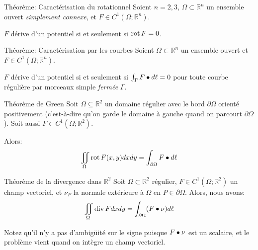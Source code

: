 \documentclass[a4paper]{article}
\begin{document}
\begin{parag}{Théorème: Caractérisation du rotationnel}
    Soient $n = 2, 3$, $\Omega \subset \mathbb{R}^n$ un ensemble ouvert \textit{simplement connexe}, et $F \in C^1\left(\Omega; \mathbb{R}^n\right)$.

    $F$ dérive d'un potentiel si et seulement si $\operatorname{rot} F = 0$.
\end{parag}

\begin{parag}{Théorème: Caractérisation par les courbes}
    Soient $\Omega \subset \mathbb{R}^n$ un ensemble ouvert et $F \in C^1\left(\Omega; \mathbb{R}^n\right)$.

    $F$ dérive d'un potentiel si et seulement si $\int_{\Gamma} F \bullet d \ell = 0$ pour toute courbe régulière par morceaux simple \textit{fermée} $\Gamma$.
\end{parag}


\begin{parag}{Théorème de Green}
    Soit $\Omega \subseteq \mathbb{R}^2$ un domaine régulier avec le bord $\partial \Omega$ orienté positivement (c'est-à-dire qu'on garde le domaine à gauche quand on parcourt $\partial \Omega$). Soit aussi $F \in C^1\left(\Omega; \mathbb{R}^2\right)$.

    Alors: 
    \[\iint_{\Omega} \rot F\left(x, y\right) dxdy = \int_{\partial\Omega} F \dotprod d \ell \]
\end{parag}


\begin{parag}{Théorème de la divergence dans $\mathbb{R}^2$}
    Soit $\Omega \subset \mathbb{R}^2$ régulier, $F \in C^1\left(\Omega;\mathbb{R}^2\right)$ un champ vectoriel, et $\nu_P$ la normale extérieure à $\Omega$ en $P \in \partial \Omega$. Alors, nous avons: 
    \[\iint_{\Omega} \Div F dxdy = \int_{\partial \Omega} \left(F \dotprod \nu\right) d \ell \]

    Notez qu'il n'y a pas d'ambigüité sur le signe puisque $F \bullet \nu$ est un scalaire, et le problème vient quand on intègre un champ vectoriel.
\end{parag}
\end{document}
